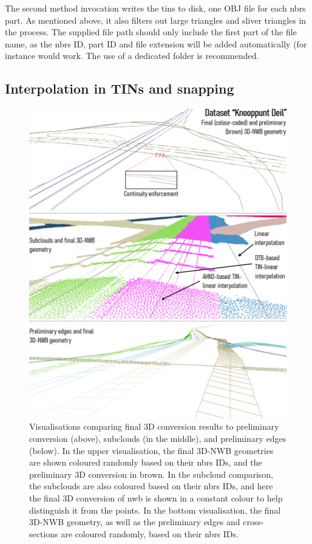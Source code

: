 The second method invocation writes the \ac{tin}s to disk, one OBJ file for each \ac{nbrs} part. As mentioned above, it also filters out large triangles and sliver triangles in the process. The supplied file path should only include the first part of the file name, as the \ac{nbrs} ID, part ID and file extension will be added automatically (for instance  would work. The use of a dedicated folder is recommended.

\subsection{Interpolation in TINs and snapping}
\label{sub:r_interpolation}

\begin{figure}
    \centering
    \includegraphics[width=\linewidth]{final_report/figs/elevationinterpolation0.png}
    \caption[Visualisations comparing final 3D-NWB geometries with intermediate results]{Visualisations comparing final 3D conversion results to preliminary conversion (above), subclouds (in the middle), and preliminary edges (below). In the upper visualisation, the final 3D-NWB geometries are shown coloured randomly based on their \ac{nbrs} IDs, and the preliminary 3D conversion in brown. In the subcloud comparison, the subclouds are also coloured based on their \ac{nbrs} IDs, and here the final 3D conversion of \ac{nwb} is shown in a constant colour to help distinguish it from the points. In the bottom visualisation, the final 3D-NWB geometry, as well as the preliminary edges and cross-sections are coloured randomly, based on their \ac{nbrs} IDs.}
    \label{fig:elevationinterpolation0}
\end{figure}

